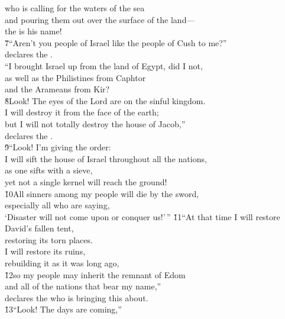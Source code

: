\begin{poetry}
\poeml who is calling for the waters of the sea \\
\poemll    and pouring them out over the surface of the land--- \\
\poemlll       the  is his name! \\
\poeml \v{7}``Aren't you people of Israel like the people of Cush to me?'' \\
\poemll    declares the . \\
\poeml ``I brought Israel up from the land of Egypt, did I not, \\
\poemll    as well as the Philistines from Caphtor \\
\poemlll       and the Arameans from Kir? \\
\poeml \v{8}Look! The eyes of the Lord  are on the sinful kingdom. \\
\poemll    I will destroy it from the face of the earth; \\
\poeml but I will not totally destroy the house of Jacob,'' \\
\poemll    declares the . \\
\poeml \v{9}``Look! I'm giving the order: \\
\poemll    I will sift the house of Israel throughout all the nations, \\
\poemlll       as one sifts with a sieve, \\
\poemll    yet not a single kernel will reach the ground! \\
\poeml \v{10}All sinners among my people will die by the sword, \\
\poemll    especially all who are saying, \\
\poemlll       `Disaster will not come upon or conquer us!'\,''
\poeml \v{11}``At that time I will restore David's fallen tent, \\
\poemll    restoring its torn places. \\
\poeml I will restore its ruins, \\
\poemll    rebuilding it as it was long ago, \\
\poeml \v{12}so my people may inherit the remnant of Edom \\
\poemll    and all of the nations that bear my name,'' \\
\poemlll       declares the  who is bringing this about. \\
\poeml \v{13}``Look! The days are coming,'' \\

\end{poetry}
